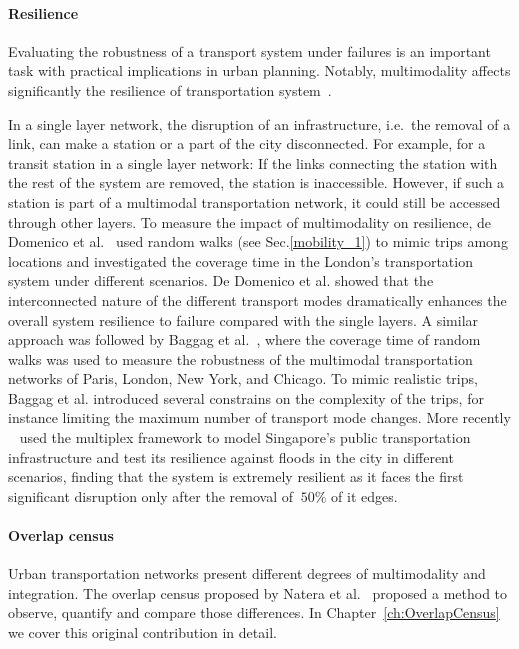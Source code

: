 \paragraph*{Resilience}
Evaluating the robustness of a transport system under failures is an important task with practical implications in urban planning. Notably, multimodality affects significantly the resilience of transportation system~\cite{dedomenico2014interconnected}.

In a single layer network, the disruption of an infrastructure, i.e.~the removal of a link, can make a station or a part of the city disconnected. For example, for a transit station in a single layer network: If the links connecting the station with the rest of the system are removed, the station is inaccessible. However, if such a station is part of a multimodal transportation network, it could still be accessed through other layers. To measure the impact of multimodality on resilience, de Domenico et al.~\cite{dedomenico2014interconnected} used random walks (see Sec.\ref{mobility_1}) to mimic trips among locations and investigated the coverage time in the London's transportation system under different scenarios. De Domenico et al. showed that the interconnected nature of the different transport modes dramatically enhances the overall system resilience to failure compared with the single layers. A similar approach was followed by Baggag et al.~\cite{baggag2018resilience}, where the coverage time of random walks was used to measure the robustness of the multimodal transportation networks of Paris, London, New York, and Chicago. To mimic realistic trips, Baggag et al. introduced several constrains on the complexity of the trips, for instance limiting the maximum number of transport mode changes. More recently ~\cite{ferretti2019resilience} used the multiplex framework to model Singapore's public transportation infrastructure and test its resilience against floods in the city in different scenarios, finding that the system is extremely resilient as it faces the first significant disruption only after the removal of $~50\%$ of it edges.

\paragraph*{Overlap census}\label{overlap}
Urban transportation networks present different degrees of multimodality and integration. The overlap census proposed by Natera et al.~\cite{natera2020multimodal} proposed a method to observe, quantify and compare those differences. In Chapter~\ref{ch:OverlapCensus} we cover this original contribution in detail.

